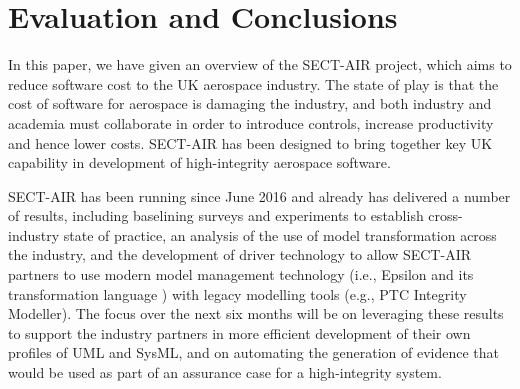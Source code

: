 \section{Evaluation and Conclusions}
\label{sec:conclusions}

In this paper, we have given an overview of the SECT-AIR project, which aims to reduce software cost to the UK aerospace industry. The state of play is that the cost of software for aerospace is damaging the industry, and both industry and academia must collaborate in order to introduce controls, increase productivity and hence lower costs. SECT-AIR has been designed to bring together key UK capability in development of high-integrity aerospace software.

SECT-AIR has been running since June 2016 and already has delivered a number of results, including baselining surveys and experiments to establish cross-industry state of practice, an analysis of the use of model transformation across the industry, and the development of driver technology to allow SECT-AIR partners to use modern model management technology (i.e., Epsilon and its transformation language \cite{Kolovos2008}) with legacy modelling tools (e.g., PTC Integrity Modeller). The focus over the next six months will be on leveraging these results to support the industry partners in more efficient development of their own profiles of UML and SysML, and on automating the generation of evidence that would be used as part of an assurance case for a high-integrity system.

